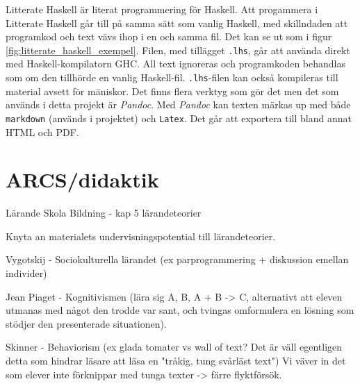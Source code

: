 \begin{draft}
Litterate Haskell är literat programmering för Haskell.\cite{litterate_haskell}
Att progammera i Litterate Haskell går till på samma sätt som vanlig Haskell,
med skillndaden att programkod och text vävs ihop i en och samma fil. Det kan
se ut som i figur \ref{fig:litterate_haskell_exempel}. Filen, med tillägget
\texttt{.lhs}, går att använda direkt med Haskell-kompilatorn GHC. All text
ignoreras och programkoden behandlas som om den tillhörde en vanlig
Haskell-fil. \texttt{.lhs}-filen kan också kompileras till material avsett för
mäniskor. Det finns flera verktyg som gör det men det som används i detta
projekt är \textit{Pandoc}\cite{pandoc}. Med \textit{Pandoc} kan texten märkas
up med både \texttt{markdown} (används i projektet) och \texttt{Latex}. Det går
att exportera till bland annat HTML och PDF.  \end{draft}
\section{ARCS/didaktik}
\label{sec:arcs}

\begin{binge}

Lärande Skola Bildning - kap 5 lärandeteorier

Knyta an materialets undervisningspotential till lärandeteorier.

Vygotskij - Sociokulturella lärandet (ex parprogrammering + diskussion emellan individer)

Jean Piaget - Kognitivismen (lära sig A, B, A + B -> C, alternativt att eleven utmanas med något den trodde var sant, och tvingas omformulera en lösning som stödjer den presenterade situationen).

Skinner - Behaviorism (ex glada tomater vs wall of text? Det är väll egentligen detta som hindrar läsare att läsa en "tråkig, tung svårläst text")
Vi väver in det som elever inte förknippar med tunga texter -> färre flyktförsök.

\iffalse
Skulle vilja hitta stöd för:
Bara något som olika bakgrunder skulle kunna ge en inbillning av miljöombyte, vilket minskar den monotona dimensionen, och i sig förhindrar hjärnans anti-"get-stuck-on-a-thought-and-die".
\fi

\end{binge}
